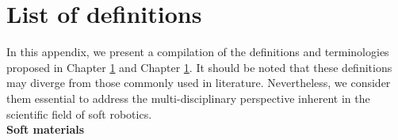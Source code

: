 \chapter{List of definitions}
In this appendix, we present a compilation of the definitions and terminologies proposed in Chapter \ref{} and Chapter \ref{}. It should be noted that these definitions may diverge from those commonly used in literature. Nevertheless, we consider them essential to address the multi-disciplinary perspective inherent in the scientific field of soft robotics. \\

\textbf{Soft materials} 